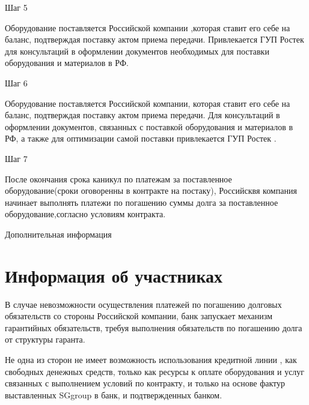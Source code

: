 \documentclass[russian]{beamer}
\begin{document}
\begin{frame} {Шаг 5}

Оборудование поставляется Российской компании ,которая ставит его
себе на баланс, подтверждая поставку актом приема передачи. Привлекается
ГУП Ростек  для консультаций в оформлении документов необходимых
для поставки оборудования и материалов в РФ. 

\end{frame}

\begin{frame} {Шаг 6}

Оборудование поставляется Российской компании, которая ставит его
себе на баланс, подтверждая поставку актом приема передачи. Для консультаций
в оформлении документов, связанных с поставкой оборудования и материалов
в РФ, а также для оптимизации самой поставки привлекается ГУП Ростек
. 

\end{frame}

\begin{frame} {Шаг 7}

После окончания срока каникул по платежам за поставленное оборудование(сроки
оговоренны в контракте на постаку), Российсквя компания начинает выполнять
платежи по погашению суммы долга за поставленное оборудование,согласно
условиям контракта.

\end{frame}

\begin{frame} {Дополнительная информация}
\section {Информация об участниках} 

В случае невозможности осуществления платежей по погашению долговых
обязательств со стороны Российской компании, банк запускает механизм
гарантийных обязательств, требуя выполнения обязательств по погашению
долга от структуры гаранта. 

Не одна из сторон не имеет возможность использования кредитной линии
, как свободных денежных средств, только как ресурсы к оплате оборудования
и услуг связанных с выполнением условий по контракту, и только на
основе фактур выставленных SGgroup в банк, и подтвержденных банком. 

\end{frame}
\end{document}
